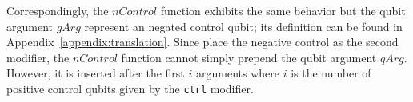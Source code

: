 Correspondingly, the $nControl$ function exhibits the same behavior but the qubit argument $gArg$ represent an negated control qubit; its definition can be found in Appendix~\ref{appendix:translation}. Since place the negative control as the second modifier, the $nControl$ function cannot simply prepend the qubit argument $qArg$. However, it is inserted after the first $i$ arguments where $i$ is the number of positive control qubits given by the \texttt{ctrl} modifier.